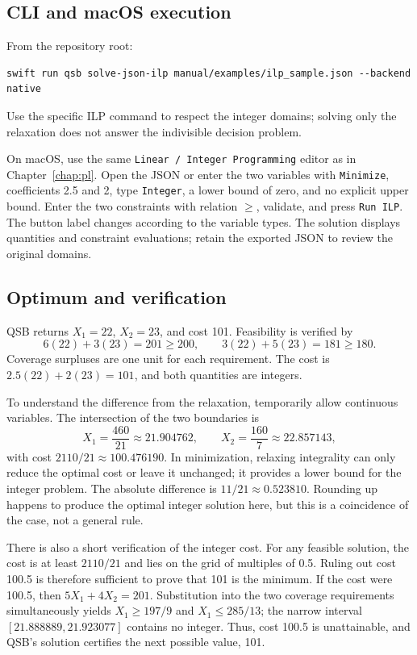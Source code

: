 \subsection{CLI and macOS execution}
From the repository root:
\begin{lstlisting}
swift run qsb solve-json-ilp manual/examples/ilp_sample.json --backend native
\end{lstlisting}
Use the specific ILP command to respect the integer domains; solving only
the relaxation does not answer the indivisible decision problem.

On macOS, use the same \texttt{Linear / Integer Programming} editor as in
Chapter~\ref{chap:pl}. Open the JSON or enter the two variables with
\texttt{Minimize}, coefficients 2.5 and 2, type \texttt{Integer}, a lower bound
of zero, and no explicit upper bound. Enter the two constraints with
relation \(\geq\), validate, and press \texttt{Run ILP}. The button label changes
according to the variable types. The solution displays quantities and
constraint evaluations; retain the exported JSON to review the original
domains.

\subsection{Optimum and verification}
QSB returns \(X_1=22\), \(X_2=23\), and cost 101. Feasibility is verified by
\[
 6(22)+3(23)=201\geq200,\qquad3(22)+5(23)=181\geq180.
\]
Coverage surpluses are one unit for each requirement. The cost is
\(2.5(22)+2(23)=101\), and both quantities are integers.

To understand the difference from the relaxation, temporarily allow
continuous variables. The intersection of the two boundaries is
\[
 X_1=\frac{460}{21}\approx21.904762,\qquad
 X_2=\frac{160}{7}\approx22.857143,
\]
with cost \(2110/21\approx100.476190\). In minimization, relaxing integrality
can only reduce the optimal cost or leave it unchanged; it provides a lower
bound for the integer problem. The absolute difference is
\(11/21\approx0.523810\). Rounding up happens to produce the optimal integer
solution here, but this is a coincidence of the case, not a general rule.

There is also a short verification of the integer cost. For any feasible
solution, the cost is at least \(2110/21\) and lies on the grid of multiples
of 0.5. Ruling out cost 100.5 is therefore sufficient to prove that 101 is the
minimum. If the cost were 100.5, then \(5X_1+4X_2=201\). Substitution into
the two coverage requirements simultaneously yields
\(X_1\geq197/9\) and \(X_1\leq285/13\); the narrow interval
\([21.888889,21.923077]\) contains no integer. Thus, cost 100.5 is
unattainable, and QSB's solution certifies the next possible value, 101.

